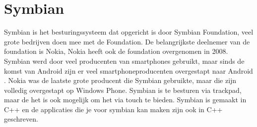 \section{Symbian}

Symbian is het besturingssysteem dat opgericht is door Symbian Foundation, veel grote bedrijven doen mee met de Foundation. De belangrijkste deelnemer van de foundation is Nokia, Nokia heeft ook de foundation overgenomen in 2008. Symbian werd door veel producenten van smartphones gebruikt, maar sinds de komst van Android zijn er veel smartphoneproducenten overgestapt naar Android \citep{nieuwemobiel}. Nokia was de laatste grote producent die Symbian gebruikte, maar die zijn volledig overgestapt op Windows Phone. Symbian is te besturen via trackpad, maar de het is ook mogelijk om het via touch te bieden. Symbian is gemaakt in C++ en de applicaties die je voor symbian kan maken zijn ook in C++ geschreven.
